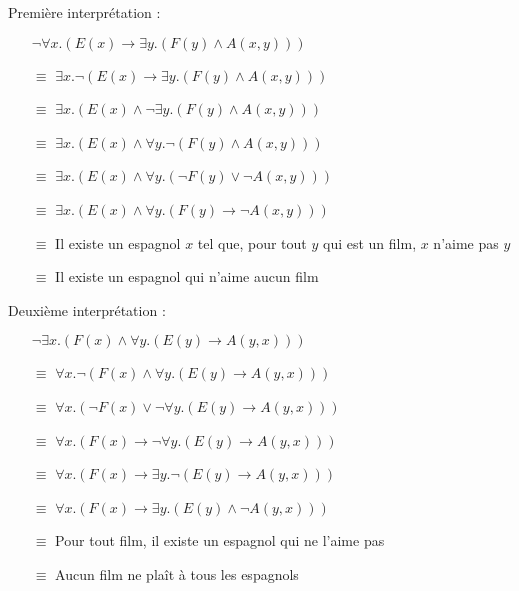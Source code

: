\begin{frame}

Première interprétation :
\begin{itemize}
\item[] $\neg \forall x. (E(x) \rightarrow \exists y. (F(y) \wedge A(x,y)))$\pause
\item[$\equiv$] $\exists x. \neg (E(x) \rightarrow \exists y. (F(y) \wedge A(x,y)))$\pause
\item[$\equiv$] $\exists x. (E(x) \wedge \neg \exists y. (F(y) \wedge A(x,y)))$\pause
\item[$\equiv$] $\exists x. (E(x) \wedge \forall y. \neg (F(y) \wedge A(x,y)))$\pause
\item[$\equiv$] $\exists x. (E(x) \wedge \forall y. (\neg F(y) \vee \neg A(x,y)))$\pause
\item[$\equiv$] $\exists x. (E(x) \wedge \forall y. (F(y) \rightarrow \neg A(x,y)))$\pause
\item[$\equiv$] Il existe un espagnol $x$ tel que, pour tout $y$ qui est un film, $x$ n'aime pas $y$\pause
\item[$\equiv$] Il existe un espagnol qui n'aime aucun film
\end{itemize}


\end{frame}


\begin{frame}

Deuxième interprétation :
\begin{itemize}
\item[] $\neg \exists x. (F(x) \wedge \forall y. (E(y) \rightarrow A(y,x)))$\pause
\item[$\equiv$] $\forall x. \neg (F(x) \wedge \forall y. (E(y) \rightarrow A(y,x)))$\pause
\item[$\equiv$] $\forall x. (\neg F(x) \vee \neg \forall y. (E(y) \rightarrow A(y,x)))$\pause
\item[$\equiv$] $\forall x. (F(x) \rightarrow \neg \forall y. (E(y) \rightarrow A(y,x)))$\pause
\item[$\equiv$] $\forall x. (F(x) \rightarrow \exists y. \neg (E(y) \rightarrow A(y,x)))$\pause
\item[$\equiv$] $\forall x. (F(x) \rightarrow \exists y. (E(y) \wedge \neg A(y,x)))$\pause
\item[$\equiv$] Pour tout film, il existe un espagnol qui ne l'aime pas\pause
\item[$\equiv$] Aucun film ne plaît à tous les espagnols
\end{itemize}
\end{frame}
	

